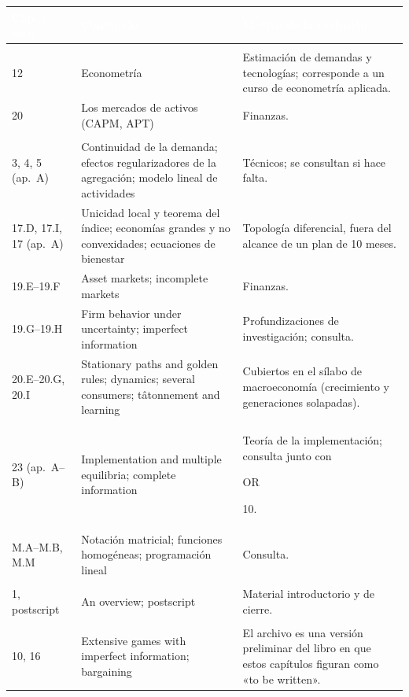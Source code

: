 \documentclass[11pt,a4paper]{article}
\newcommand{\cab}[1]{\textcolor{white}{\sffamily\bfseries #1}}
\newcommand{\filasalternas}{\rowcolors{2}{white}{tonoPalido}}
\newcommand{\etiqueta}[2]{%
  {\setlength{\fboxsep}{1.4pt}\colorbox{#1}{\sffamily\bfseries\color{white}\strut#2}}}
\newcommand{\ORU}[1]{\etiqueta{colorOR}{OR}\nobreak\hspace{0.25em}\textcolor{colorOR}{#1}}
\begin{document}
\medskip
{\small\filasalternas
\noindent\begin{tabularx}{\textwidth}{lXX}
\toprule
\rowcolor{tonoOscuro}\cab{Cap. / secc.} & \cab{Contenido} & \cab{Motivo de la exclusión} \\
\midrule
\rowcolor{tonoHielo}\multicolumn{3}{l}{\textcolor{colorV}{\textbf{Varian}}} \\
12 & Econometría & Estimación de demandas y tecnologías; corresponde a un curso de econometría aplicada. \\
20 & Los mercados de activos (CAPM, APT) & Finanzas. \\
\midrule
\rowcolor{tonoHielo}\multicolumn{3}{l}{\textcolor{colorMWG}{\textbf{Mas-Colell, Whinston y Green}}} \\
3, 4, 5 (ap.~A) & Continuidad de la demanda; efectos regularizadores de la agregación; modelo lineal de actividades & Técnicos; se consultan si hace falta. \\
17.D, 17.I, 17 (ap.~A) & Unicidad local y teorema del índice; economías grandes y no convexidades; ecuaciones de bienestar & Topología diferencial, fuera del alcance de un plan de 10 meses. \\
19.E--19.F & Asset markets; incomplete markets & Finanzas. \\
19.G--19.H & Firm behavior under uncertainty; imperfect information & Profundizaciones de investigación; consulta. \\
20.E--20.G, 20.I & Stationary paths and golden rules; dynamics; several consumers; tâtonnement and learning & Cubiertos en el sílabo de macroeconomía (crecimiento y generaciones solapadas). \\
23 (ap.~A--B) & Implementation and multiple equilibria; complete information & Teoría de la implementación; consulta junto con \ORU{10}. \\
M.A--M.B, M.M & Notación matricial; funciones homogéneas; programación lineal & Consulta. \\
\midrule
\rowcolor{tonoHielo}\multicolumn{3}{l}{\textcolor{colorK}{\textbf{Kreps}}} \\
1, postscript & An overview; postscript & Material introductorio y de cierre. \\
\midrule
\rowcolor{tonoHielo}\multicolumn{3}{l}{\textcolor{colorO}{\textbf{Osborne}}} \\
10, 16 & Extensive games with imperfect information; bargaining & El archivo es una versión preliminar del libro en que estos capítulos figuran como «to be written». \\

\end{tabularx}}
\end{document}
